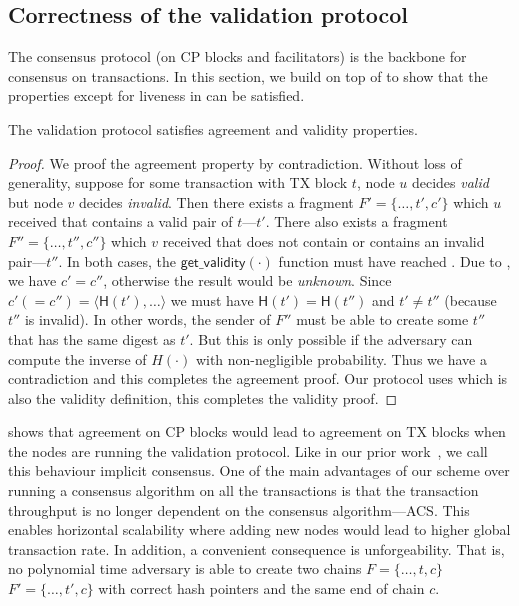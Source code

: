 \subsection{Correctness of the validation protocol}
The consensus protocol (on CP blocks and facilitators) is the backbone for consensus on transactions.
In this section, we build on top of  to show that the properties except for liveness in  can be satisfied.

\begin{theorem}
\label{theorem:validation-agreement}
The validation protocol satisfies agreement and validity properties.
\end{theorem}
\begin{proof}
We proof the agreement property by contradiction.
Without loss of generality, suppose for some transaction with TX block $t$,
node $u$ decides \emph{valid} but node $v$ decides \emph{invalid}.
Then there exists a fragment $F' = \{ \dots, t', c'\}$ which $u$ received that contains a valid pair of $t$---$t'$.
There also exists a fragment $F'' = \{ \dots, t'', c''\}$ which $v$ received that does not contain or contains an invalid pair---$t''$.
In both cases, the $\textsf{get\_validity}(\cdot)$ function must have reached .
Due to , we have $c' = c''$, otherwise the result would be \emph{unknown}.
Since $c' (= c'') = \langle \textsf{H}(t'), \dots \rangle$ we must have $\textsf{H}(t') = \textsf{H}(t'')$ and $t' \ne t''$ (because $t''$ is invalid).
In other words, the sender of $F''$ must be able to create some $t''$ that has the same digest as $t'$.
But this is only possible if the adversary can compute the inverse of $H(\cdot)$ with non-negligible probability.
Thus we have a contradiction and this completes the agreement proof.
Our protocol uses  which is also the validity definition,
this completes the validity proof.
\end{proof}

 shows that agreement on CP blocks would lead to agreement on TX blocks when the nodes are running the validation protocol.
Like in our prior work~\cite{implicitconsensus}, we call this behaviour implicit consensus.
One of the main advantages of our scheme over running a consensus algorithm on all the transactions is that 
the transaction throughput is no longer dependent on the consensus algorithm---ACS.
This enables horizontal scalability where adding new nodes would lead to higher global transaction rate.
In addition, a convenient consequence  is unforgeability.
That is, no polynomial time adversary is able to create two chains $F = \{ \dots, t, c\}$ $F' = \{ \dots, t', c\}$ with correct hash pointers and the same end of chain $c$.

